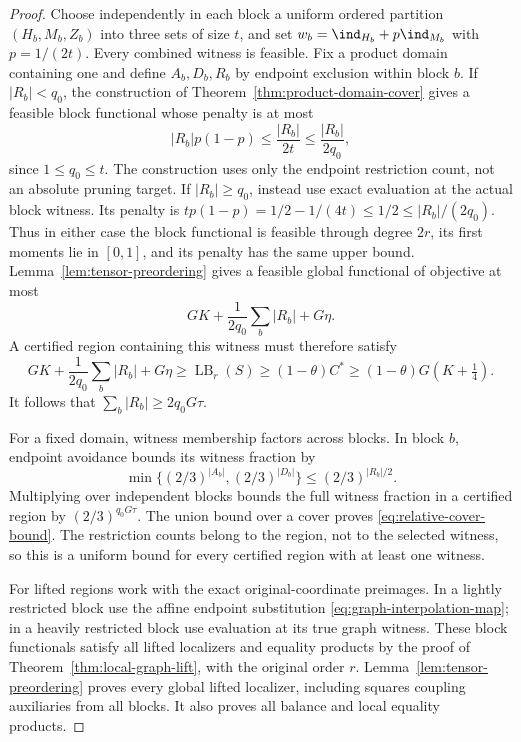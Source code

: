 \begin{proof}
Choose independently in each block a uniform ordered partition
$(H_b,M_b,Z_b)$ into three sets of size $t$, and set
$w_b=\ind_{H_b}+p\ind_{M_b}$ with $p=1/(2t)$.
Every combined witness is feasible. Fix a product domain containing one
and define $A_b,D_b,R_b$ by endpoint exclusion within block $b$.
If $|R_b|<q_0$, the construction of
Theorem~\ref{thm:product-domain-cover} gives a feasible block functional
whose penalty is at most
\[
 |R_b|p(1-p)\le\frac{|R_b|}{2t}
                    \le\frac{|R_b|}{2q_0},
\]
since $1\le q_0\le t$. The construction uses only the endpoint
restriction count, not an absolute pruning target.
If $|R_b|\ge q_0$, instead use exact evaluation at the actual block
witness. Its penalty is
$tp(1-p)=1/2-1/(4t)\le1/2\le |R_b|/(2q_0)$.
Thus in either case the block functional is feasible through degree
$2r$, its first moments lie in $[0,1]$, and its penalty has the same
upper bound. Lemma~\ref{lem:tensor-preordering} gives a feasible global
functional of objective at most
\begin{equation}\label{eq:relative-witness-bound}
 GK+\frac1{2q_0}\sum_b|R_b|+G\eta.
\end{equation}
A certified region containing this witness must therefore satisfy
\[
 GK+\frac1{2q_0}\sum_b|R_b|+G\eta
 \ge\operatorname{LB}_r(S)\ge(1-\theta)C^*
 \ge(1-\theta)G(K+\tfrac14).
\]
It follows that $\sum_b|R_b|\ge2q_0G\tau$.

For a fixed domain, witness membership factors across blocks. In block
$b$, endpoint avoidance bounds its witness fraction by
\[
 \min\{(2/3)^{|A_b|},(2/3)^{|D_b|}\}
 \le(2/3)^{|R_b|/2}.
\]
Multiplying over independent blocks bounds the full witness fraction in
a certified region by $(2/3)^{q_0G\tau}$. The union bound over a cover
proves \eqref{eq:relative-cover-bound}. The restriction counts belong
to the region, not to the selected witness, so this is a uniform bound
for every certified region with at least one witness.

For lifted regions work with the exact original-coordinate preimages.
In a lightly restricted block use the affine endpoint substitution
\eqref{eq:graph-interpolation-map}; in a heavily restricted block use
evaluation at its true graph witness. These block functionals satisfy all
lifted localizers and equality products by the proof of
Theorem~\ref{thm:local-graph-lift}, with the original order $r$.
Lemma~\ref{lem:tensor-preordering} proves every global lifted localizer,
including squares coupling auxiliaries from all blocks. It also proves
all balance and local equality products.


\end{proof}
